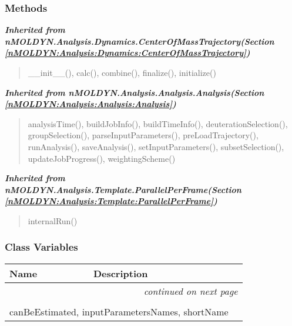 
  \subsubsection{Methods}


\large{\textbf{\textit{Inherited from nMOLDYN.Analysis.Dynamics.CenterOfMassTrajectory\textit{(Section \ref{nMOLDYN:Analysis:Dynamics:CenterOfMassTrajectory})}}}}

\begin{quote}
\_\_init\_\_(), calc(), combine(), finalize(), initialize()
\end{quote}

\large{\textbf{\textit{Inherited from nMOLDYN.Analysis.Analysis.Analysis\textit{(Section \ref{nMOLDYN:Analysis:Analysis:Analysis})}}}}

\begin{quote}
analysisTime(), buildJobInfo(), buildTimeInfo(), deuterationSelection(), groupSelection(), parseInputParameters(), preLoadTrajectory(), runAnalysis(), saveAnalysis(), setInputParameters(), subsetSelection(), updateJobProgress(), weightingScheme()
\end{quote}

\large{\textbf{\textit{Inherited from nMOLDYN.Analysis.Template.ParallelPerFrame\textit{(Section \ref{nMOLDYN:Analysis:Template:ParallelPerFrame})}}}}

\begin{quote}
internalRun()
\end{quote}


  \subsubsection{Class Variables}

    \vspace{-1cm}
\hspace{\varindent}\begin{longtable}{|p{\varnamewidth}|p{\vardescrwidth}|l}
\cline{1-2}
\cline{1-2} \centering \textbf{Name} & \centering \textbf{Description}& \\
\cline{1-2}
\endhead\cline{1-2}\multicolumn{3}{r}{\small\textit{continued on next page}}\\\endfoot\cline{1-2}
\endlastfoot\multicolumn{2}{|l|}{\textit{Inherited from nMOLDYN.Analysis.Dynamics.CenterOfMassTrajectory \textit{(Section \ref{nMOLDYN:Analysis:Dynamics:CenterOfMassTrajectory})}}}\\
\multicolumn{2}{|p{\varwidth}|}{\raggedright canBeEstimated, inputParametersNames, shortName}\\
\cline{1-2}
\end{longtable}

